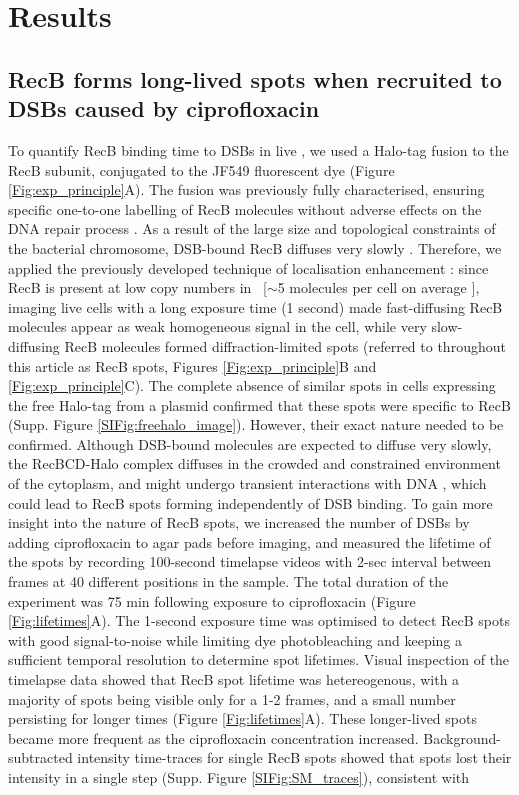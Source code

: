 \section*{Results}

\subsection*{RecB forms long-lived spots when recruited to DSBs caused by cipro\-floxacin}
To quantify RecB binding time to DSBs in live \ecoli, we used a Halo-tag fusion to the RecB subunit, conjugated to the JF549 fluorescent dye (Figure \ref{Fig:exp_principle}A). The fusion was previously fully characterised, ensuring specific one-to-one labelling of RecB molecules without adverse effects on the DNA repair process \cite{Lepore2019a,Lepore2025}. As a result of the large size and topological constraints of the bacterial chromosome, DSB-bound RecB diffuses very slowly \cite{Lepore2025}. Therefore, we applied the previously developed technique of localisation enhancement \cite{Yu2006, Elf2007}: since RecB is present at low copy numbers in \ecoli\ [$\sim$5 molecules per cell on average \cite{Lepore2019a,Kalita2024}], imaging live cells with a long exposure time (1 second) made fast-diffusing RecB molecules appear as weak homogeneous signal in the cell, while very slow-diffusing RecB molecules formed diffraction-limited spots (referred to throughout this article as RecB spots, Figures \ref{Fig:exp_principle}B and \ref{Fig:exp_principle}C). The complete absence of similar spots in cells expressing the free Halo-tag from a plasmid confirmed that these spots were specific to RecB (Supp. Figure \ref{SIFig:freehalo_image}). However, their exact nature needed to be confirmed. Although DSB-bound molecules are expected to diffuse very slowly, the RecBCD-Halo complex diffuses in the crowded and constrained environment of the cytoplasm, and might undergo transient interactions with DNA \cite{Lepore2025}, which could lead to RecB spots forming independently of DSB binding. To gain more insight into the nature of RecB spots, we increased the number of DSBs by adding ciprofloxacin to agar pads before imaging, and measured the lifetime of the spots by recording 100-second timelapse videos with 2-sec interval between frames at 40 different positions in the sample. The total duration of the experiment was 75 min following exposure to ciprofloxacin (Figure \ref{Fig:lifetimes}A). The 1-second exposure time was optimised to detect RecB spots with good signal-to-noise while limiting dye photobleaching and keeping a sufficient temporal resolution to determine spot lifetimes. Visual inspection of the timelapse data showed that RecB spot lifetime was hetereogenous, with a majority of spots being visible only for a 1-2 frames, and a small number persisting for longer times (Figure \ref{Fig:lifetimes}A). These longer-lived spots became more frequent as the ciprofloxacin concentration increased. Background-subtracted intensity time-traces for single RecB spots showed that spots lost their intensity in a single step (Supp. Figure \ref{SIFig:SM_traces}), consistent with 